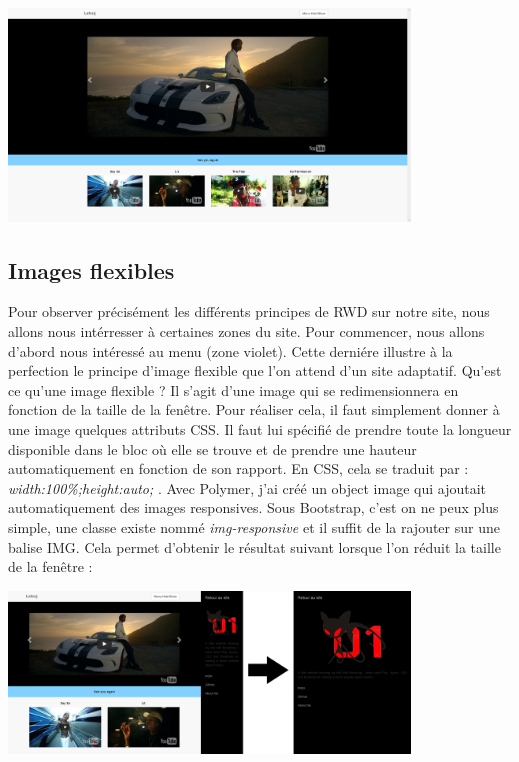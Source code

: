 \documentclass{article}
\begin{document}
\begin{center}
  \includegraphics[width=0.8\textwidth]{p1}
\end{center}

\subsection{Images flexibles}

Pour observer pr\'ecis\'ement les diff\'erents principes de RWD sur notre site, nous allons nous int\'erresser \`a certaines zones du site. Pour commencer, nous allons d'abord nous int\'eress\'e au menu (zone violet). Cette derni\'ere illustre \`a la perfection le principe d'image flexible que l'on attend d'un site adaptatif. Qu'est ce qu'une image flexible ? Il s'agit d'une image qui se redimensionnera en fonction de la taille de la fen\^etre. Pour r\'ealiser cela, il faut simplement donner \`a une image quelques attributs CSS. Il faut lui sp\'ecifi\'e de prendre toute la longueur disponible dans le bloc o\`u elle se trouve et de prendre une hauteur automatiquement en fonction de son rapport. En CSS, cela se traduit par : \textit{\og width:100\%;height:auto; \fg{} }. Avec Polymer, j'ai cr\'e\'e un object image qui ajoutait automatiquement des images responsives. Sous Bootstrap, c'est on ne peux plus simple, une classe existe nomm\'e \textit{\og img-responsive \fg} et il suffit de la rajouter sur une balise IMG. Cela permet d'obtenir le r\'esultat suivant lorsque l'on r\'eduit la taille de la fen\^etre :\\

\begin{center}
  \includegraphics[width=0.8\textwidth]{p4}
\end{center}
\end{document}

